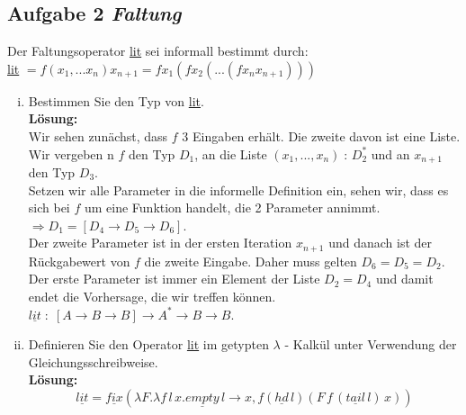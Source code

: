 \documentclass[11pt,a4paper,ngerman]{article}
\begin{document}
\subsection*{Aufgabe 2 \mdseries\itshape Faltung}
Der Faltungsoperator \underline{lit} sei informall bestimmt durch:\\
\underline{lit} $= f(x_1,...x_n) x_{n+1} = f x_1 (f x_2 (... (f x_n x_{n+1}) ))$\\

\begin{enumerate}[(i)]
   \item Bestimmen Sie den Typ von \underline{lit}.\\
   \textbf{Lösung:}\\
      Wir sehen zunächst, dass $f$ 3 Eingaben erhält. Die zweite davon ist eine Liste.\\
      Wir vergeben n $f$ den Typ $D_1$, an die Liste $(x_1,...,x_n) \; : \, D_2^*$ und
      an $x_{n+1}$ den Typ $D_3$.\\

      Setzen wir alle Parameter in die informelle Definition ein, sehen wir, dass es sich
      bei $f$ um eine Funktion handelt, die 2 Parameter annimmt.\\
      $\Rightarrow D_1 = [D_4 \rightarrow D_5 \rightarrow D_6]$.\\
      
      Der zweite Parameter ist in der ersten Iteration $x_{n+1}$ und danach ist der 
      Rückgabewert von $f$ die zweite Eingabe. Daher muss gelten $D_6 = D_5 = D_2$.\\

      Der erste Parameter ist immer ein Element der Liste $D_2 = D_4$ und damit endet
      die Vorhersage, die wir treffen können.\\

      $\underline{lit} \; : \; [A \rightarrow B \rightarrow B] \rightarrow A^* \rightarrow B \rightarrow B$.

   \item Definieren Sie den Operator \underline{lit} im getypten 
      $\lambda$ - Kalkül unter Verwendung der Gleichungsschreibweise.\\
    \textbf{Lösung:}\\
         $$
            \underline{lit} = \underline{fix}\left(\lambda F.\lambda f \,l \,x. \underline{empty} \, l
               \rightarrow x, f (\underline{hd} \,l) (F \, f \,(\underline{tail} \,l) \,x)\right)
         $$
      
\pagebreak


\end{enumerate}
\end{document}
